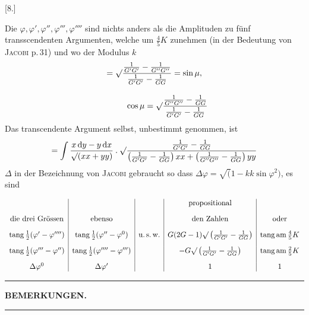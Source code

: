 \par\medskip{}\centerline{[8.]}\nobreak\smallskip
Die $\varphi,\varphi',\varphi'',\varphi''',\varphi''''$ sind nichts anders als die Amplituden zu fünf transscendenten Argumenten, welche um $\frac45K$ zunehmen (in der Bedeutung von \textsc{Jacobi}
p.\,31) und wo der Modulus $k$
\[
\begin{gathered}=\surd\frac{\frac{1}{G'G'}-\frac{1}{G''G''}}{\frac{1}{G'G'}-\frac{1}{GG}} =\sin\mu,\\[9pt]\quad{}\qquad \cos\mu=\surd\frac{\frac{1}{G''G''}-\frac{1}{GG}}{\frac{1}{G'G'}-\frac{1}{GG}}\end{gathered}
\]
Das transcendente Argument selbst, unbestimmt genommen, ist
\[
=\int\frac{x\,\mathrm{d}y-y\,\mathrm{d}x}{\surd(xx+yy)}\mathbin{.} \surd\frac{\frac{1}{G'G'}-\frac{1}{GG}} {\left(\frac{1}{G'G'}-\frac{1}{GG}\right)xx+\left(\frac{1}{G''G''}-\frac{1}{GG}\right)yy}
\]
$\Delta$ in der Bezeichnung von \textsc{Jacobi} gebraucht so dass $\Delta\varphi=\surd(1-kk\sin\varphi^2)$,
es sind
\par\nopagebreak%
\begingroup\small\setlength{\arraycolsep}{2pt}\[
\begin{array}{c|c|c|c|c} & & &\text{propositional}&\\[9pt] \text{die drei Grössen}&\text{ebenso}&&\text{den Zahlen}&\text{oder}\\[9pt] \operatorname{tang}\frac12(\varphi'-\varphi'''')& \operatorname{tang}\frac12(\varphi''-\varphi^0)&\text{u.\,s.\,w.}& G(2G-1)\surd\left(\frac{1}{G'G'}-\frac{1}{GG}\right)& \operatorname{tang}\operatorname{am}\frac45K\\[9pt] \operatorname{tang}\frac12(\varphi'''-\varphi'')& \operatorname{tang}\frac12(\varphi''''-\varphi''')&& -G\surd\left(\frac{1}{G'G'}-\frac{1}{GG}\right)& \operatorname{tang}\operatorname{am}\frac25K\\[9pt] \Delta\varphi^0&\Delta\varphi'&&1&1 \end{array}
\]\endgroup\par%

\par\nopagebreak\begin{center}\rule{.25\textwidth}{.4pt}\end{center}


\clearpage{}
\begin{center}\Large\textbf{BEMERKUNGEN.}\end{center}
\begin{center}\rule{.09\textwidth}{.4pt}\end{center}

